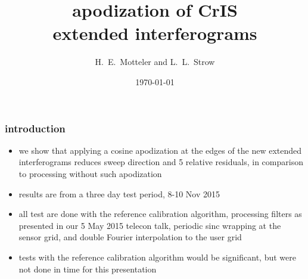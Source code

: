 \documentclass[11pt]{beamer}
\title{apodization of CrIS \\ 
       extended interferograms
}
\author{H.~E.~Motteler and L.~L.~Strow}
\institute{
UMBC Atmospheric Spectroscopy Lab \\
  Joint Center for Earth Systems Technology \\
}
\date{\today}
\begin{document}
\begin{frame}[plain]
\titlepage
\end{frame}
\begin{frame}
\frametitle{introduction}

\begin{itemize}

  \item we show that applying a cosine apodization at the edges of
    the new extended interferograms reduces sweep direction and
    {\fov} 5 relative residuals, in comparison to processing without
    such apodization

  \item results are from a three day test period, 8-10 Nov 2015

  \item all test are done with the {\ccast} reference calibration
    algorithm, processing filters as presented in our 5 May 2015
    telecon talk, periodic sinc wrapping at the sensor grid, and
    double Fourier interpolation to the user grid

  \item tests with the {\noaa} reference calibration algorithm would
    be significant, but were not done in time for this presentation
    
\end{itemize}

\end{frame}
\end{document}
